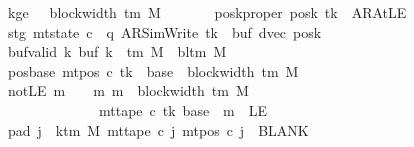 \begin{isabellebody}
\ \ \ \ \ \ \ kge{}{\isacharcolon}{\kern0pt}\ {\isachardoublequoteopen}{}\ {\isasymle}\ block{\isacharunderscore}{\kern0pt}width\ {\isacharparenleft}{\kern0pt}{\isasymGamma}{\isacharunderscore}{\kern0pt}tm\ M{\isacharparenright}{\kern0pt}{\isachardoublequoteclose}\isanewline
\ \ \ \ \ \ \ poskproper{\isacharcolon}{\kern0pt}\ {\isachardoublequoteopen}posk\ tk\ {\isasymnoteq}\ AR{\isacharunderscore}{\kern0pt}AtLE{\isachardoublequoteclose}\isanewline
\ \ \ \ \ \ \ stg{\isacharcolon}{\kern0pt}\ {\isachardoublequoteopen}mt{\isacharunderscore}{\kern0pt}state\ c{}\ {\isacharequal}{\kern0pt}\ {\isacharparenleft}{\kern0pt}q{\isacharcomma}{\kern0pt}\ AR{\isacharunderscore}{\kern0pt}SimWrite{\isacharcomma}{\kern0pt}\ tk{\isacharcomma}{\kern0pt}\ {}{\isacharcomma}{\kern0pt}\ buf{\isacharcomma}{\kern0pt}\ dvec{\isacharcomma}{\kern0pt}\ posk{\isacharparenright}{\kern0pt}{\isachardoublequoteclose}\isanewline
\ \ \ \ \ \ \ buf{\isacharunderscore}{\kern0pt}valid{\isacharcolon}{\kern0pt}\ {\isachardoublequoteopen}{\isasymforall}k{\isachardot}{\kern0pt}\ buf\ k\ {\isasymin}\ {\isasymGamma}{\isacharunderscore}{\kern0pt}tm\ M\ {\isasymunion}\ {\isacharbraceleft}{\kern0pt}bl{\isacharunderscore}{\kern0pt}tm\ M{\isacharbraceright}{\kern0pt}{\isachardoublequoteclose}\isanewline
\ \ \ \ \ \ \ pos{\isacharunderscore}{\kern0pt}base{\isacharcolon}{\kern0pt}\ {\isachardoublequoteopen}mt{\isacharunderscore}{\kern0pt}pos\ c{}\ tk\ {\isacharequal}{\kern0pt}\ base\ {\isacharplus}{\kern0pt}\ block{\isacharunderscore}{\kern0pt}width\ {\isacharparenleft}{\kern0pt}{\isasymGamma}{\isacharunderscore}{\kern0pt}tm\ M{\isacharparenright}{\kern0pt}{\isachardoublequoteclose}\isanewline
\ \ \ \ \ \ \ notLE{\isacharcolon}{\kern0pt}\ {\isachardoublequoteopen}{\isasymAnd}m{\isachardot}{\kern0pt}\ {\isasymlbrakk}\ {}\ {\isasymle}\ m{\isacharsemicolon}{\kern0pt}\ m\ {\isasymle}\ block{\isacharunderscore}{\kern0pt}width\ {\isacharparenleft}{\kern0pt}{\isasymGamma}{\isacharunderscore}{\kern0pt}tm\ M{\isacharparenright}{\kern0pt}\ {\isasymrbrakk}\isanewline
\ \ \ \ \ \ \ \ \ \ \ \ \ \ \ \ \ \ \ {\isasymLongrightarrow}\ mt{\isacharunderscore}{\kern0pt}tape\ c{}\ tk\ {\isacharparenleft}{\kern0pt}base\ {\isacharplus}{\kern0pt}\ m{\isacharparenright}{\kern0pt}\ {\isasymnoteq}\ LE{}{\isachardoublequoteclose}\isanewline
\ \ \ \ \ \ \ pad{}{\isacharcolon}{\kern0pt}\ {\isachardoublequoteopen}{\isasymforall}j\ {\isasymge}\ k{\isacharunderscore}{\kern0pt}tm\ M{\isachardot}{\kern0pt}\ mt{\isacharunderscore}{\kern0pt}tape\ c{}\ j\ {\isacharparenleft}{\kern0pt}mt{\isacharunderscore}{\kern0pt}pos\ c{}\ j{\isacharparenright}{\kern0pt}\ {\isacharequal}{\kern0pt}\ BLANK{}{\isachardoublequoteclose}\isanewline

\end{isabellebody}
